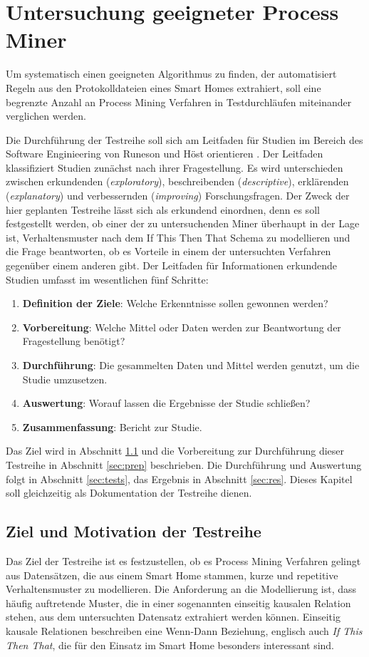 \chapter{Untersuchung geeigneter Process Miner}\label{chap:approach}
Um systematisch einen geeigneten Algorithmus zu finden, der automatisiert Regeln aus den Protokolldateien eines Smart Homes extrahiert, soll eine begrenzte Anzahl an Process Mining Verfahren in Testdurchläufen miteinander verglichen werden. 

Die Durchführung der Testreihe soll sich am Leitfaden für Studien im Bereich des Software Enginieering von Runeson und Höst orientieren \cite{runh}. Der Leitfaden klassifiziert Studien zunächst nach ihrer Fragestellung. Es wird unterschieden zwischen erkundenden (\textit{exploratory}), beschreibenden (\textit{descriptive}), erklärenden (\textit{explanatory}) und verbessernden (\textit{improving}) Forschungsfragen. Der Zweck der hier geplanten Testreihe lässt sich als erkundend einordnen, denn es soll festgestellt werden, ob einer der zu untersuchenden Miner überhaupt in der Lage ist, Verhaltensmuster nach dem If This Then That Schema zu modellieren und die Frage beantworten, ob es Vorteile in einem der untersuchten Verfahren gegenüber einem anderen gibt. 
Der Leitfaden für Informationen erkundende Studien umfasst im wesentlichen fünf Schritte: 

\begin{enumerate}
  \item \textbf{Definition der Ziele}: Welche Erkenntnisse sollen gewonnen werden?
  \item \textbf{Vorbereitung}: Welche Mittel oder Daten werden zur Beantwortung der Fragestellung benötigt?
  \item \textbf{Durchführung}: Die gesammelten Daten und Mittel werden genutzt, um die Studie umzusetzen. 
  \item \textbf{Auswertung}: Worauf lassen die Ergebnisse der Studie schließen?
  \item \textbf{Zusammenfassung}: Bericht zur Studie.
\end{enumerate}

Das Ziel wird in Abschnitt \ref{sec:def} und die Vorbereitung zur Durchführung dieser Testreihe  in Abschnitt \ref{sec:prep} beschrieben. Die Durchführung und Auswertung folgt in Abschnitt  \ref{sec:tests}, das Ergebnis in Abschnitt \ref{sec:res}. Dieses Kapitel soll gleichzeitig als Dokumentation der Testreihe dienen.

\section{Ziel und Motivation der Testreihe}\label{sec:def}
Das Ziel der Testreihe ist es festzustellen, ob es Process Mining Verfahren gelingt aus Datensätzen, die aus einem Smart Home stammen, kurze und repetitive Verhaltensmuster zu modellieren. Die Anforderung an die Modellierung ist, dass häufig auftretende Muster, die in einer sogenannten einseitig kausalen Relation stehen, aus dem untersuchten Datensatz extrahiert werden können. Einseitig kausale Relationen beschreiben eine Wenn-Dann Beziehung, englisch auch \textit{If This Then That}, die für den Einsatz im Smart Home besonders interessant sind. 

